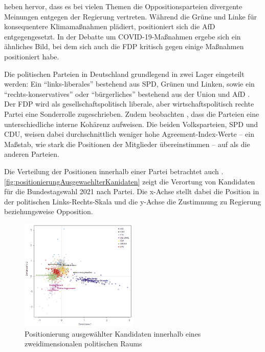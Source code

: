 \textcite{engler_wettbewerb_2022} heben hervor, dass es bei vielen Themen die Oppositionsparteien divergente Meinungen entgegen der Regierung vertreten. Während die Grüne und Linke für konsequentere Klimamaßnahmen plädiert, positioniert sich die \ac{AfD} entgegengesetzt. In der Debatte um \ac{COVID-19}-Maßnahmen ergebe sich ein ähnliches Bild, bei dem sich auch die \ac{FDP} kritisch gegen einige Maßnahmen positioniert habe.

Die politischen Parteien in Deutschland grundlegend in zwei Lager eingeteilt werden: Ein \enquote{links-liberales} bestehend aus \ac{SPD}, Grünen und Linken, sowie ein \enquote{rechts-konservatives} oder \enquote{bürgerliches} bestehend aus der Union und \ac{AfD} \autocite{thomeczek_politische_2019}. Der \ac{FDP} wird als gesellschaftspolitisch liberale, aber wirtschaftspolitisch rechte Partei eine Sonderrolle zugeschrieben. Zudem beobachten \textcite{thomeczek_politische_2019}, dass die Parteien eine unterschiedliche interne Kohärenz aufweisen. Die beiden Volksparteien, \ac{SPD} und \ac{CDU}, weisen dabei durchschnittlich weniger hohe Agreement-Index-Werte -- ein Maßstab, wie stark die Positionen der Mitglieder übereinstimmen -- auf als die anderen Parteien.

Die Verteilung der Positionen innerhalb einer Partei betrachtet auch \textcite{saltzer_bundestagswahl_2022}. \autoref{fig:positionierungAusgewaehlterKanidaten} zeigt die Verortung von Kandidaten für die Bundestagswahl \num{2021} nach Partei. Die x-Achse stellt dabei die Position in der politischen Links-Rechts-Skala und die y-Achse die Zustimmung zu Regierung beziehungsweise Opposition.

\begin{figure}[H]
    \centering
    \includegraphics[width=0.5\textwidth]{data/images/positionierung_ausgewaehlter_kandidaten.png}
    \caption[Positionierung ausgewählter Kandidaten \autocite{saltzer_bundestagswahl_2022}]{Positionierung ausgewählter Kandidaten innerhalb eines zweidimensionalen politischen Raums \autocite{saltzer_bundestagswahl_2022}} \label{fig:positionierungAusgewaehlterKanidaten}
\end{figure}

